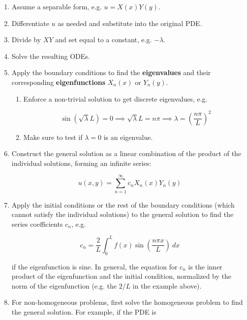 \begin{enumerate}
    \item Assume a separable form, e.g. $u = X(x)Y(y)$.
    \item Differentiate $u$ as needed and substitute into the original PDE.
    \item Divide by $XY$ and set equal to a constant, e.g. $-\lambda$.
    \item Solve the resulting ODEs.
    \item Apply the boundary conditions to find the \textbf{eigenvalues} and their corresponding \textbf{eigenfunctions} $X_n(x)$ or $Y_n(y)$.
          \begin{enumerate}
              \item Enforce a non-trivial solution to get discrete eigenvalues, e.g.

                    \begin{equation*}
                        \sin(\sqrt{\lambda}L) = 0 \implies \sqrt{\lambda}L = n\pi \implies \lambda = \left(\frac{n\pi}{L}\right)^2
                    \end{equation*}

              \item Make sure to test if $\lambda = 0$ is an eigenvalue.
          \end{enumerate}
    \item Construct the general solution as a linear combination of the product of the individual solutions, forming an infinite series:

          \begin{equation*}
              u(x, y) = \sum_{n=1}^{\infty} c_n X_n(x)Y_n(y)
          \end{equation*}

    \item Apply the initial conditions or the rest of the boundary conditions (which cannot satisfy the individual solutions) to the general solution to find the series coefficients $c_n$, e.g.

          \begin{equation*}
              c_n = \frac{2}{L} \int_0^L f(x)\sin(\frac{n\pi x}{L})~dx
          \end{equation*}

          if the eigenfunction is sine. In general, the equation for $c_n$ is the inner product of the eigenfunction and the initial condition, normalized by the norm of the eigenfunction (e.g. the $2/L$ in the example above).
    \item For non-homogeneous problems, first solve the homogeneous problem to find the general solution. For example, if the PDE is


\end{enumerate}
